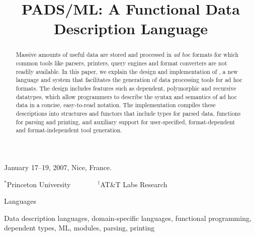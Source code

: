 \documentclass{sigplanconf}
\begin{document}
 {January 17--19, 2007, Nice, France.}



\title{PADS/ML: A Functional Data Description Language}
{$^\ast$Princeton University \ \ \ \ \ \ \ $^\dagger$AT\&T Labs Research}
 { \ \ \ \ }



\maketitle{}

\begin{abstract}  

  Massive amounts of useful data are stored and processed in
  \textit{ad hoc} formats for which common tools like parsers,
  printers, query engines and format converters are not readily 
  available.  In this paper,
  we explain the design and implementation of \padsml{},
  a new language and system that facilitates the
  generation of data processing tools for ad hoc formats.
  The \padsml{} design includes features such as
  dependent, polymorphic and recursive datatypes, which allow
  programmers to describe
  the syntax and semantics of ad hoc data in a concise,
  easy-to-read notation.
  The \padsml{} implementation compiles these descriptions
  into \ml{} structures and functors
  that include types for parsed data, functions for parsing
  and printing, and auxiliary support
  for user-specified, format-dependent and format-independent 
  tool generation.

\end{abstract}


\terms
Languages

\keywords
Data description languages, domain-specific languages, functional programming,
dependent types, ML, modules, parsing, printing





\end{document}
